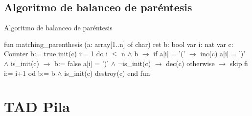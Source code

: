 \subsection{Algoritmo de balanceo de paréntesis}

\begin{codebox}{Algoritmo de balanceo de paréntesis}
\begin{pascallike}
fun matching_parenthesis (a: array[1..n] of char) ret b: bool
    var i: nat
    var c: Counter
    b:= true
    init(c)
    i:= 1
    do i $\leq$ n $\wedge$ b $\rightarrow$ if a[i] = '(' $\rightarrow$ inc(c)
                                    a[i] = ')' $\wedge$ is_init(c) $\rightarrow$ b:= false
                                    a[i] = ')' $\wedge$ $\neg$is_init(c) $\rightarrow$ dec(c)
                                    otherwise $\rightarrow$ skip
                                fi
                                i:= i+1
    od
    b:= b $\wedge$ is_init(c)
    destroy(c)
end fun
\end{pascallike}
\end{codebox}

\section{TAD Pila}